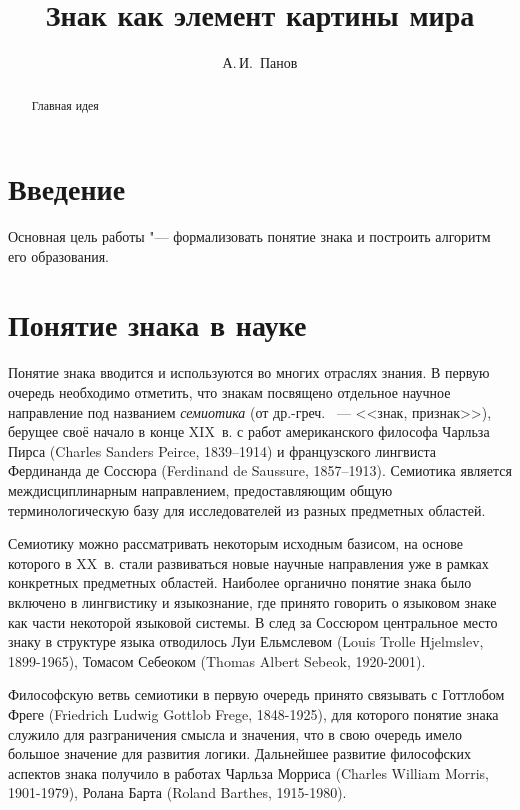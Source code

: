 \documentclass[a4paper,12pt]{article}
\begin{document}
	\title{Знак как элемент картины мира}
	\author{А.\,И.~Панов}
	
	\maketitle{}
	
	\begin{abstract}
		Главная идея
	\end{abstract}
	
	\section*{Введение}
	Основная цель работы "--- формализовать понятие знака и построить алгоритм его образования.
	
	\section{Понятие знака в науке}
	Понятие знака вводится и используются во многих отраслях знания. В первую очередь необходимо отметить, что знакам посвящено отдельное научное направление под названием \textit{семиотика} (от др.-греч. \textsigma\texteta\textmu\textepsilon\textiota\textomikron\textnu ~--- <<знак, признак>>), берущее своё начало в конце XIX~в. с работ американского философа Чарльза Пирса (Charles Sanders Peirce, 1839--1914) и французского лингвиста Фердинанда де Соссюра (Ferdinand de Saussure, 1857--1913). Семиотика является междисциплинарным направлением, предоставляющим общую терминологическую базу для исследователей из разных предметных областей. 
	
	Семиотику можно рассматривать некоторым исходным базисом, на основе которого в XX~в. стали развиваться новые научные направления уже в рамках конкретных предметных областей. Наиболее органично понятие знака было включено в лингвистику и языкознание, где принято говорить о языковом знаке как части некоторой языковой системы. В след за Соссюром центральное место знаку в структуре языка отводилось Луи Ельмслевом (Louis Trolle Hjelmslev, 1899-1965), Томасом Себеоком (Thomas Albert Sebeok, 1920-2001).
	
	Философскую ветвь семиотики в первую очередь принято связывать с Готтлобом Фреге (Friedrich Ludwig Gottlob Frege, 1848-1925), для которого понятие знака служило для разграничения смысла и значения, что в свою очередь имело большое значение для развития логики. Дальнейшее развитие философских аспектов знака получило в работах Чарльза Морриса (Charles William Morris, 1901-1979), Ролана Барта (Roland Barthes, 1915-1980).
	
\end{document}
